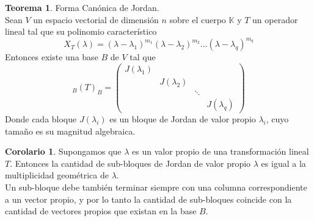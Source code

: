 \documentclass[10pt]{article}
\theoremstyle{definition}
\newtheorem{theorem}{Teorema}[section]
\newtheorem{corollary}{Corolario}[theorem]
\begin{document}
\begin{theorem}{Forma Canónica de Jordan.}
	\\Sean $V$ un espacio vectorial de dimensión $n$ sobre el cuerpo $\mathbb{K}$ y $T$ un operador lineal tal que su polinomio característico $$X_T(\lambda)=(\lambda - \lambda _1)^{m_1}(\lambda -\lambda _2)^{m_2}\dots (\lambda - \lambda _q)^{m_q}$$
	Entonces existe una base $B$ de $V$ tal que
	$$_B(T)_B=\begin{pmatrix}
			J(\lambda _1) &               &        &               \\
			              & J(\lambda _2) &        &               \\
			              &               & \ddots &               \\
			              &               &        & J(\lambda _q)
		\end{pmatrix}$$
	Donde cada bloque $J(\lambda _i)$ es un bloque de Jordan de valor propio $\lambda _i$, cuyo tamaño es su magnitud algebraica.
\end{theorem}
\begin{corollary}
	Supongamos que $\lambda$ es un valor propio de una transformación lineal $T$. Entonces la cantidad de sub-bloques de Jordan de valor propio $\lambda$ es igual a  la multiplicidad geométrica de $\lambda$.\\
	Un sub-bloque debe también terminar siempre con una columna correspondiente a un vector propio, y por lo tanto la cantidad de sub-bloques coincide con la cantidad de vectores propios que existan en la base $B$.
\end{corollary}
\end{document}
